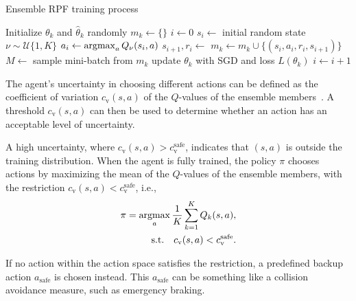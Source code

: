 \begin{algorithm}[h]
	\caption{Ensemble RPF training process}\label{alg:ensamble_training}
	\begin{algorithmic}[1]
			\State Initialize $\theta_k$ and $\hat{\theta}_k$ randomly
			\State $m_k \gets \{\}$
		\EndFor
		\State $i \gets 0$
			\State $s_i \gets $ initial random state
			\State $\nu \sim \mathcal{U}\{1,K\}$%
				\State $a_i \gets \operatorname*{argmax}_{a} Q_\nu(s_i,a)$
				\State $s_{i+1}, r_i \gets $ 
						\State $m_k \gets m_k \cup \{(s_i, a_i, r_i, s_{i+1})\}$
					\EndIf
					\State $M \gets $ sample mini-batch from $m_k$
					\State update $\theta_k$ with SGD and loss $L(\theta_k)$
				\EndFor
				\State $i \gets i + 1$
			\EndWhile
		\EndWhile
	\end{algorithmic}
\end{algorithm}

The agent's uncertainty in choosing different actions can be defined as the coefficient of variation $c_\mathrm{v}(s,a)$ of the $Q$-values of the ensemble members~\cite{Hoel2020}.
A threshold $c_\mathrm{v}(s,a)$ can then be used to determine whether an action has an acceptable level of uncertainty.

A high uncertainty, where $c_\mathrm{v}(s,a) > c_\mathrm{v}^\mathrm{safe}$, indicates that $(s,a)$ is outside the training distribution. 
When the agent is fully trained, the policy $\pi$ chooses actions by maximizing the mean of the $Q$-values of the ensemble members, with the restriction $c_\mathrm{v}(s,a) < c_\mathrm{v}^\mathrm{safe}$, i.e.,
%
\begin{equation}
	\begin{aligned}
		\pi = \operatorname*{argmax}_{a} \frac{1}{K} \sum_{k=1}^K Q_k(s,a),\\
		\textrm{s.t.} \quad c_\mathrm{v}(s,a) < c_\mathrm{v}^\mathrm{safe}.
	\end{aligned}
\end{equation}

If no action within the action space satisfies the restriction, a predefined backup action $a_\mathrm{safe}$ is chosen instead. This $a_\mathrm{safe}$ can be something like a collision avoidance measure, such as emergency braking.
%

